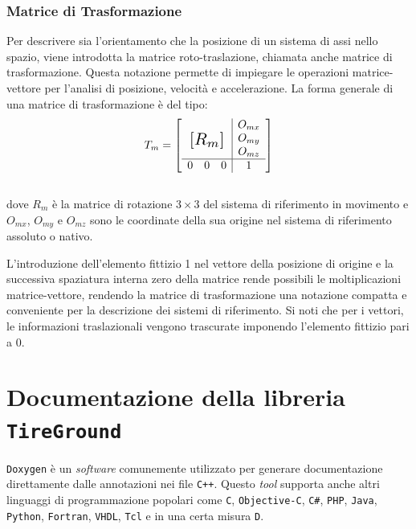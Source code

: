 \subsection{Matrice di Trasformazione}
Per descrivere sia l'orientamento che la posizione di un sistema di assi nello spazio, viene introdotta la matrice roto-traslazione, chiamata anche matrice di trasformazione. Questa notazione permette di impiegare le operazioni matrice-vettore per l'analisi di posizione, velocità e accelerazione. La forma generale di una matrice di trasformazione è del tipo:
%
\begin{equation}
T_m = \left[
\begin{array}{ccc|c}
& & & O_{mx}\\
\multicolumn{3}{c|}{\multirow{3}{*}{\raisebox{20mm}{\scalebox{1.5}{$[R_m]$}}}} & O_{my}\\
& & & O_{mz}\\ \hline
0 & 0 & 0 & 1
\end{array}\right]
\end{equation}\\
%
dove $R_m$ è la matrice di rotazione $3 \times 3$ del sistema di riferimento in movimento e $O_{mx}$, $O_{my}$ e $O_{mz}$ sono le coordinate della sua origine nel sistema di riferimento assoluto o nativo.

L'introduzione dell'elemento fittizio 1 nel vettore della posizione di origine e la successiva spaziatura interna zero della matrice rende possibili le moltiplicazioni matrice-vettore, rendendo la matrice di trasformazione una notazione compatta e conveniente per la descrizione dei sistemi di riferimento. Si noti che per i vettori, le informazioni traslazionali vengono trascurate imponendo l'elemento fittizio pari a 0.
%
\chapter{Documentazione della libreria \texttt{TireGround}}
\label{Documentation}
%
\texttt{Doxygen} è un \textit{software} comunemente utilizzato per generare documentazione direttamente dalle annotazioni nei file \texttt{C++}. Questo \textit{tool} supporta anche altri linguaggi di programmazione popolari come \texttt{C}, \texttt{Objective-C}, \texttt{C\#}, \texttt{PHP},  \texttt{Java},  \texttt{Python}, \texttt{Fortran},  \texttt{VHDL},  \texttt{Tcl} e in una certa misura  \texttt{D}.

